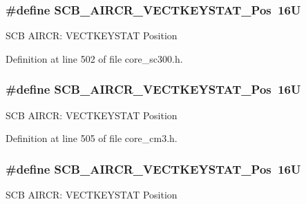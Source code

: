 \subsubsection[{\texorpdfstring{S\+C\+B\+\_\+\+A\+I\+R\+C\+R\+\_\+\+V\+E\+C\+T\+K\+E\+Y\+S\+T\+A\+T\+\_\+\+Pos}{SCB_AIRCR_VECTKEYSTAT_Pos}}]{\setlength{\rightskip}{0pt plus 5cm}\#define S\+C\+B\+\_\+\+A\+I\+R\+C\+R\+\_\+\+V\+E\+C\+T\+K\+E\+Y\+S\+T\+A\+T\+\_\+\+Pos~16U}\hypertarget{group___c_m_s_i_s___s_c_b_gaec404750ff5ca07f499a3c06b62051ef}{}\label{group___c_m_s_i_s___s_c_b_gaec404750ff5ca07f499a3c06b62051ef}
S\+CB A\+I\+R\+CR\+: V\+E\+C\+T\+K\+E\+Y\+S\+T\+AT Position 

Definition at line 502 of file core\+\_\+sc300.\+h.

\subsubsection[{\texorpdfstring{S\+C\+B\+\_\+\+A\+I\+R\+C\+R\+\_\+\+V\+E\+C\+T\+K\+E\+Y\+S\+T\+A\+T\+\_\+\+Pos}{SCB_AIRCR_VECTKEYSTAT_Pos}}]{\setlength{\rightskip}{0pt plus 5cm}\#define S\+C\+B\+\_\+\+A\+I\+R\+C\+R\+\_\+\+V\+E\+C\+T\+K\+E\+Y\+S\+T\+A\+T\+\_\+\+Pos~16U}\hypertarget{group___c_m_s_i_s___s_c_b_gaec404750ff5ca07f499a3c06b62051ef}{}\label{group___c_m_s_i_s___s_c_b_gaec404750ff5ca07f499a3c06b62051ef}
S\+CB A\+I\+R\+CR\+: V\+E\+C\+T\+K\+E\+Y\+S\+T\+AT Position 

Definition at line 505 of file core\+\_\+cm3.\+h.

\subsubsection[{\texorpdfstring{S\+C\+B\+\_\+\+A\+I\+R\+C\+R\+\_\+\+V\+E\+C\+T\+K\+E\+Y\+S\+T\+A\+T\+\_\+\+Pos}{SCB_AIRCR_VECTKEYSTAT_Pos}}]{\setlength{\rightskip}{0pt plus 5cm}\#define S\+C\+B\+\_\+\+A\+I\+R\+C\+R\+\_\+\+V\+E\+C\+T\+K\+E\+Y\+S\+T\+A\+T\+\_\+\+Pos~16U}\hypertarget{group___c_m_s_i_s___s_c_b_gaec404750ff5ca07f499a3c06b62051ef}{}\label{group___c_m_s_i_s___s_c_b_gaec404750ff5ca07f499a3c06b62051ef}
S\+CB A\+I\+R\+CR\+: V\+E\+C\+T\+K\+E\+Y\+S\+T\+AT Position 

